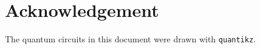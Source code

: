 \section*{Acknowledgement}

The quantum circuits in this document were drawn with \texttt{quantikz}\cite{Quantikz}.